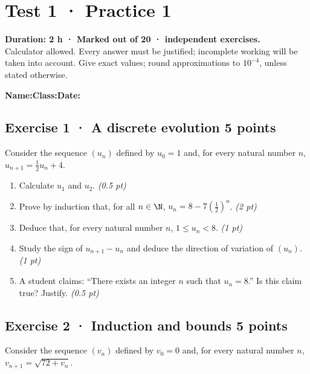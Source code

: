 \mxnewpage{}\label{sujet:1-1}

\section*{Test 1 · Practice 1}


\textbf{Duration: 2 h · Marked out of 20 ·  independent exercises.}\\Calculator allowed. Every answer must be justified; incomplete working will be taken into account. Give exact values; round approximations to $10^{-4}$, unless stated otherwise.

\smallskip\textbf{Name:}\enspace\dotfill\quad\textbf{Class:}\enspace\dotfill\quad\textbf{Date:}\enspace\dotfill

\subsection*{Exercise 1 · A discrete evolution \hfill 5 points}Consider the sequence $(u_n)$ defined by $u_0=1$ and, for every natural number $n$, $u_{n+1}=\frac{1}{2}u_n+4$.

\begin{enumerate}

\item Calculate $u_1$ and $u_2$. \hfill\textit{(0.5 pt)}

\item Prove by induction that, for all $n\in\N$, $u_n=8-7\left(\frac{1}{2}\right)^n$. \hfill\textit{(2 pt)}

\item Deduce that, for every natural number $n$, $1\le u_n<8$. \hfill\textit{(1 pt)}

\item Study the sign of $u_{n+1}-u_n$ and deduce the direction of variation of $(u_n)$. \hfill\textit{(1 pt)}

\item A student claims: ``There exists an integer $n$ such that $u_n=8$.'' Is this claim true? Justify. \hfill\textit{(0.5 pt)}

\end{enumerate}

\subsection*{Exercise 2 · Induction and bounds \hfill 5 points}Consider the sequence $(v_n)$ defined by $v_0=0$ and, for every natural number $n$, $v_{n+1}=\sqrt{72+v_n}$.

